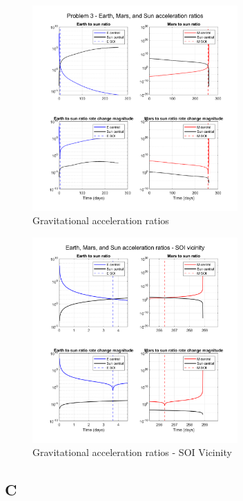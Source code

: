 \documentclass[conf]{new-aiaa}
\begin{document}
\begin{figure}[H]
    \centering 
    \includegraphics[width=0.7\textwidth]{Problem 3 - Earth, Mars, and Sun acceleration ratios.pdf}
    \caption{Gravitational acceleration ratios}
\end{figure}

\begin{figure}[H]
    \centering 
    \includegraphics[width=0.7\textwidth]{Problem 3 - Earth, Mars, and Sun acceleration ratios - SOI vicinity.pdf}
    \caption{Gravitational acceleration ratios - SOI Vicinity}
    \label{fig:accel_ratio_SOI}
\end{figure}

\subsection*{C}
\end{document}
